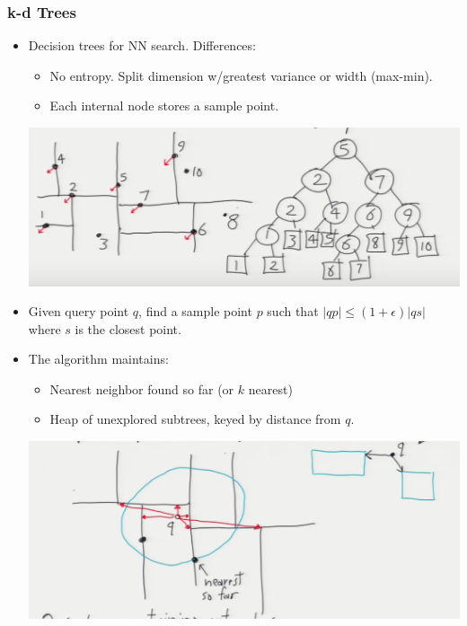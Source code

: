 \documentclass[10pt]{article}
\begin{document}
\subsubsection*{k-d Trees}
\begin{itemize}
	\item Decision trees for NN search. Differences:
		\begin{itemize}
			\item No entropy. Split dimension w/greatest variance or width (max-min).
			\item Each internal node stores a sample point.
		\end{itemize}
		\begin{center}
			\includegraphics{../images/kdtrees}
		\end{center}
	\item Given query point $q$, find a sample point $p$ such that $|qp| \leq (1 + \epsilon)|qs|$ where $s$ is the closest point.
	\item The algorithm maintains:
		\begin{itemize}
			\item Nearest neighbor found so far (or $k$ nearest)
			\item Heap of unexplored subtrees, keyed by distance from $q$.
		\end{itemize}
		\begin{center}
			\includegraphics{../images/treekd}
		\end{center}
\begin{codeblock}

\end{codeblock}
\end{itemize}
\end{document}
